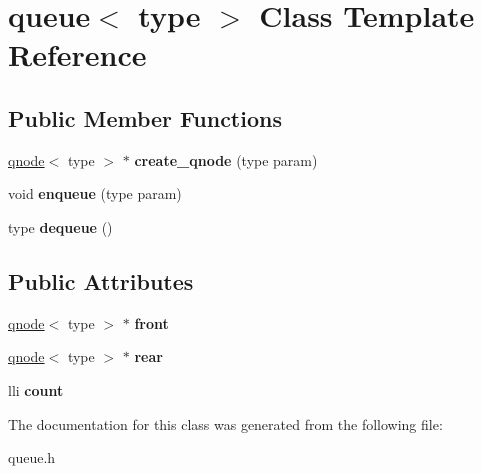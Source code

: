 \hypertarget{classqueue}{}\section{queue$<$ type $>$ Class Template Reference}
\label{classqueue}
\subsection*{Public Member Functions}
\begin{DoxyCompactItemize}
\item 
\hyperlink{classqnode}{qnode}$<$ type $>$ $\ast$ {\bfseries create\+\_\+qnode} (type param)\hypertarget{classqueue_a7d6f5ea8c82624db0b8e8a1f52f329f9}{}\label{classqueue_a7d6f5ea8c82624db0b8e8a1f52f329f9}

\item 
void {\bfseries enqueue} (type param)\hypertarget{classqueue_aa84999d1093e9b39609cf826b753217e}{}\label{classqueue_aa84999d1093e9b39609cf826b753217e}

\item 
type {\bfseries dequeue} ()\hypertarget{classqueue_a03180492dc52fd70a6f3390e26a27830}{}\label{classqueue_a03180492dc52fd70a6f3390e26a27830}

\end{DoxyCompactItemize}
\subsection*{Public Attributes}
\begin{DoxyCompactItemize}
\item 
\hyperlink{classqnode}{qnode}$<$ type $>$ $\ast$ {\bfseries front}\hypertarget{classqueue_a897a8173cade1ecd728f4ff81ca2a703}{}\label{classqueue_a897a8173cade1ecd728f4ff81ca2a703}

\item 
\hyperlink{classqnode}{qnode}$<$ type $>$ $\ast$ {\bfseries rear}\hypertarget{classqueue_a60e4bc16d20c35cca874b11a7229ec77}{}\label{classqueue_a60e4bc16d20c35cca874b11a7229ec77}

\item 
lli {\bfseries count}\hypertarget{classqueue_ac32b6faecdb15d492fa69b0ea2403fd8}{}\label{classqueue_ac32b6faecdb15d492fa69b0ea2403fd8}

\end{DoxyCompactItemize}


The documentation for this class was generated from the following file\+:\begin{DoxyCompactItemize}
\item 
queue.\+h\end{DoxyCompactItemize}
